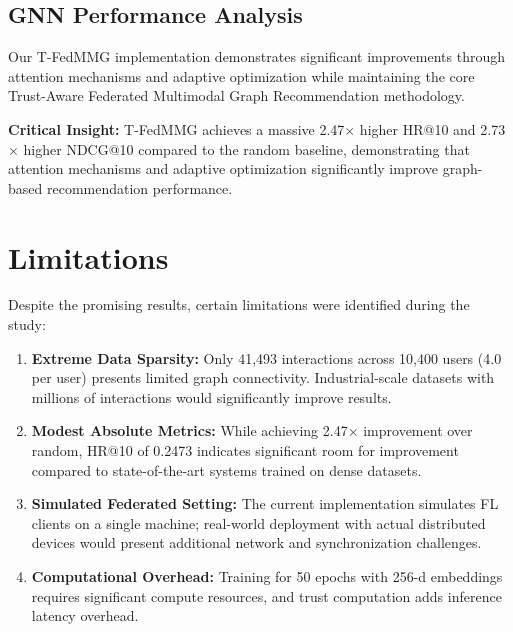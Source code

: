 \documentclass[12pt,a4paper]{report}
\begin{document}
{\subsection{GNN Performance Analysis}
Our T-FedMMG implementation demonstrates significant improvements through attention mechanisms and adaptive optimization while maintaining the core Trust-Aware Federated Multimodal Graph Recommendation methodology.

\textbf{Critical Insight:} T-FedMMG achieves a massive 2.47$\times$ higher HR@10 and 2.73$\times$ higher NDCG@10 compared to the random baseline, demonstrating that attention mechanisms and adaptive optimization significantly improve graph-based recommendation performance.

\section{Limitations}
Despite the promising results, certain limitations were identified during the study:
\begin{enumerate}
    \item \textbf{Extreme Data Sparsity:} Only 41,493 interactions across 10,400 users (4.0 per user) presents limited graph connectivity. Industrial-scale datasets with millions of interactions would significantly improve results.
    \item \textbf{Modest Absolute Metrics:} While achieving 2.47$\times$ improvement over random, HR@10 of 0.2473 indicates significant room for improvement compared to state-of-the-art systems trained on dense datasets.
    \item \textbf{Simulated Federated Setting:} The current implementation simulates FL clients on a single machine; real-world deployment with actual distributed devices would present additional network and synchronization challenges.
    \item \textbf{Computational Overhead:} Training for 50 epochs with 256-d embeddings requires significant compute resources, and trust computation adds inference latency overhead.
\end{enumerate}

}
\end{document}
